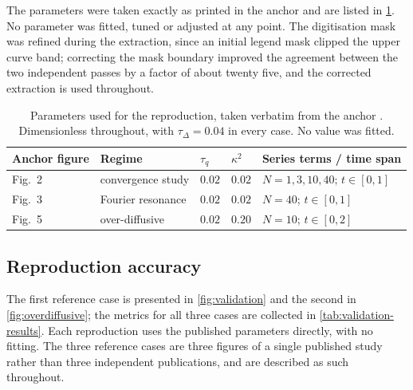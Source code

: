 \documentclass[preprint,12pt,a4paper]{elsarticle}
\theoremstyle{plain}
\theoremstyle{definition}
\theoremstyle{remark}
\newcommand{\tq}{\tau_{q}}
\newcommand{\kk}{\kappa^{2}}
\begin{document}
The parameters were taken exactly as printed in the anchor and are listed in
\cref{tab:validation-params}. No parameter was fitted, tuned or adjusted at any
point. The digitisation mask was refined during the extraction, since an
initial legend mask clipped the upper curve band; correcting the mask boundary
improved the agreement between the two independent passes by a factor of about
twenty five, and the corrected extraction is used throughout.
\begin{table}[htbp]
  \centering
  \caption{Parameters used for the reproduction, taken verbatim from the
           anchor \cite{Kovacs2018}. Dimensionless throughout, with
           $\tau_{\Delta}=0.04$ in every case. No value was fitted.}
  \label{tab:validation-params}
  \small
  \begin{tabular}{@{}lllll@{}}
    \toprule
    \textbf{Anchor figure} & \textbf{Regime} & $\tq$ & $\kk$ &
    \textbf{Series terms / time span} \\
    \midrule
    Fig.~2 & convergence study    & $0.02$ & $0.02$ &
      $N = 1,3,10,40$; $t\in[0,1]$ \\
    Fig.~3 & Fourier resonance    & $0.02$ & $0.02$ &
      $N = 40$; $t\in[0,1]$ \\
    Fig.~5 & over-diffusive       & $0.02$ & $0.20$ &
      $N = 10$; $t\in[0,2]$ \\
    \bottomrule
  \end{tabular}
\end{table}


\subsection{Reproduction accuracy}
\label{sec:val-results}

The first reference case is presented in \cref{fig:validation} and the second
in \cref{fig:overdiffusive}; the metrics for all three cases are collected in
\cref{tab:validation-results}. Each reproduction uses the
published parameters directly, with no fitting. The three reference cases are
three figures of a single published study \cite{Kovacs2018} rather than three
independent publications, and are described as such throughout.
\end{document}
